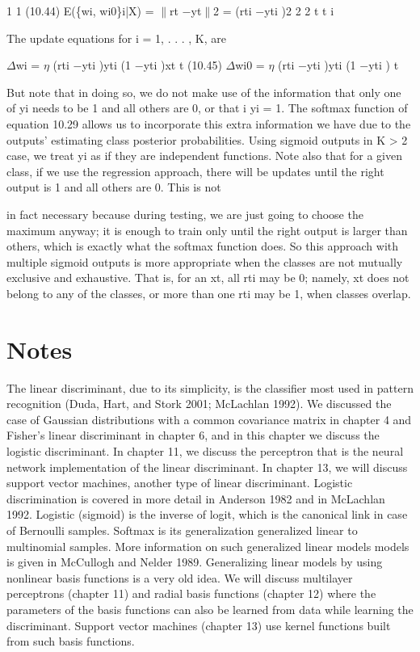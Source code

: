 1 1 (10.44) E(\{wi, wi0\}i|X) = $\parallel$rt $-$yt$\parallel$2 = (rti $-$yti )2 2 2 t t i

The update equations for i = 1, . . . , K, are

$\Delta$wi = $\eta$ (rti $-$yti )yti (1 $-$yti )xt t (10.45) $\Delta$wi0 = $\eta$ (rti $-$yti )yti (1 $-$yti ) t

But note that in doing so, we do not make use of the information that only one of yi needs to be 1 and all others are 0, or that i yi = 1. The softmax function of equation 10.29 allows us to incorporate this extra information we have due to the outputs’ estimating class posterior probabilities. Using sigmoid outputs in K > 2 case, we treat yi as if they are independent functions. Note also that for a given class, if we use the regression approach, there will be updates until the right output is 1 and all others are 0. This is not

in fact necessary because during testing, we are just going to choose the maximum anyway; it is enough to train only until the right output is larger than others, which is exactly what the softmax function does. So this approach with multiple sigmoid outputs is more appropriate when the classes are not mutually exclusive and exhaustive. That is, for an xt, all rti may be 0; namely, xt does not belong to any of the classes, or more than one rti may be 1, when classes overlap.

\section{Notes}

The linear discriminant, due to its simplicity, is the classifier most used in pattern recognition (Duda, Hart, and Stork 2001; McLachlan 1992). We discussed the case of Gaussian distributions with a common covariance matrix in chapter 4 and Fisher’s linear discriminant in chapter 6, and in this chapter we discuss the logistic discriminant. In chapter 11, we discuss the perceptron that is the neural network implementation of the linear discriminant. In chapter 13, we will discuss support vector machines, another type of linear discriminant. Logistic discrimination is covered in more detail in Anderson 1982 and in McLachlan 1992. Logistic (sigmoid) is the inverse of logit, which is the canonical link in case of Bernoulli samples. Softmax is its generalization generalized linear to multinomial samples. More information on such generalized linear models models is given in McCullogh and Nelder 1989. Generalizing linear models by using nonlinear basis functions is a very old idea. We will discuss multilayer perceptrons (chapter 11) and radial basis functions (chapter 12) where the parameters of the basis functions can also be learned from data while learning the discriminant. Support vector machines (chapter 13) use kernel functions built from such basis functions.

